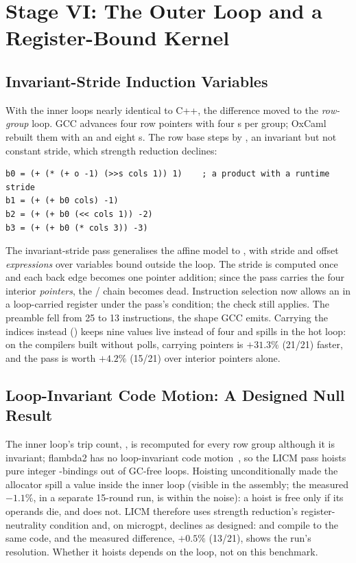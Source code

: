 \section{Stage VI: The Outer Loop and a Register-Bound Kernel}
\label{sec:stage6}

\subsection{Invariant-Stride Induction Variables}
\label{sec:ivs}
With the inner loops nearly identical to C++, the difference moved to the
\emph{row-group} loop. GCC advances four row pointers with four s
per group; OxCaml rebuilt them with an  and eight s.
The row base  steps by , an invariant but not
constant stride, which strength reduction declines:

\begin{lstlisting}[language=CmmX,caption={The row bases in Cmm (tagged arithmetic).},label=lst:rowbases,numbers=none]
b0 = (+ (* (+ o -1) (>>s cols 1)) 1)    ; a product with a runtime stride
b1 = (+ (+ b0 cols) -1)
b2 = (+ (+ b0 (<< cols 1)) -2)
b3 = (+ (+ b0 (* cols 3)) -3)
\end{lstlisting}

The invariant-stride pass generalises the affine model to
, with stride and offset
\emph{expressions} over variables bound outside the loop. The stride is
computed once and each back edge becomes one pointer addition; since the pass
carries the four interior \emph{pointers}, the / chain
becomes dead. Instruction selection now allows an  in a
loop-carried register under the pass's condition; the 
check still applies. The preamble fell from 25 to 13 instructions, the shape
GCC emits. Carrying the indices
instead () keeps nine values live instead of
four and spills in the hot loop: on the compilers built without polls,
carrying pointers is $+31.3\%$ (21/21) faster, and the pass is
worth $+4.2\%$ (15/21) over interior pointers alone.

\subsection{Loop-Invariant Code Motion: A Designed Null Result}
The inner loop's trip count, , is recomputed for every
row group although it is invariant; flambda2 has no loop-invariant code
motion~\cite{aho2006dragon}, so the LICM pass hoists pure integer
-bindings out of GC-free loops. Hoisting unconditionally made the
allocator spill a value inside the inner loop (visible in the assembly; the
measured $-1.1\%$, in a separate 15-round run, is within the noise): a hoist
is free only if its operands die, and  does not. LICM therefore
uses strength reduction's register-neutrality condition and, on microgpt,
declines as designed:  and  compile to the
same code, and the measured difference, $+0.5\%$ (13/21), shows the
run's resolution. Whether it hoists depends on the loop, not on this
benchmark.

